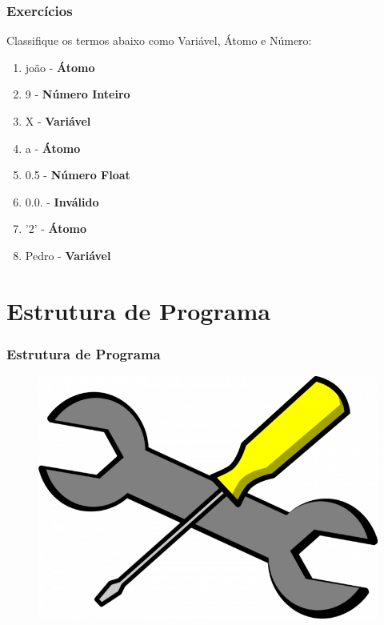 \documentclass[sans]{beamer}
\begin{document}
\begin{frame}[fragile]   %
\frametitle{Exercícios}
\begin{block}{Classifique os termos abaixo como Variável, Átomo e Número:}

\begin{enumerate}

\item joão - {\bf Átomo}
\item 9 - {\bf Número Inteiro}
\item X - {\bf Variável}
\item a - {\bf Átomo}
\item 0.5 - {\bf Número Float}
\item 0.0. - {\bf Inválido}
\item '2' - {\bf Átomo} 
\item Pedro - {\bf Variável}

\end{enumerate}
\end{block}   
\end{frame}


\section{Estrutura de Programa} 
\begin{frame}[fragile]   %
\frametitle{Estrutura de Programa}

 
\begin{figure}[!htb]
\centering
\includegraphics[scale = 0.2]{figuras/chave.png}
\label{fig_chave}
\end{figure}
 

\end{frame}
\end{document}
